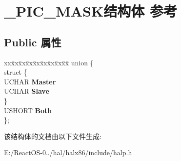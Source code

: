 \hypertarget{struct___p_i_c___m_a_s_k}{}\section{\+\_\+\+P\+I\+C\+\_\+\+M\+A\+S\+K结构体 参考}
\label{struct___p_i_c___m_a_s_k}
\subsection*{Public 属性}
\begin{DoxyCompactItemize}
\item 
\mbox{\label{struct___p_i_c___m_a_s_k_a9c408b2773544b36d4228cd9b5c6b3d8}} 
\begin{tabbing}
xx\=xx\=xx\=xx\=xx\=xx\=xx\=xx\=xx\=\kill
union \{\\
\mbox{\label{union___p_i_c___m_a_s_k_1_1_0D1344_aebb95e2eca6c053e7cceb53de9449740}} 
\>struct \{\\
\>\>UCHAR {\bfseries Master}\\
\>\>UCHAR {\bfseries Slave}\\
\>\} \\
\>USHORT {\bfseries Both}\\
\}; \\

\end{tabbing}\end{DoxyCompactItemize}


该结构体的文档由以下文件生成\+:\begin{DoxyCompactItemize}
\item 
E\+:/\+React\+O\+S-\/0../hal/halx86/include/halp.\+h\end{DoxyCompactItemize}
